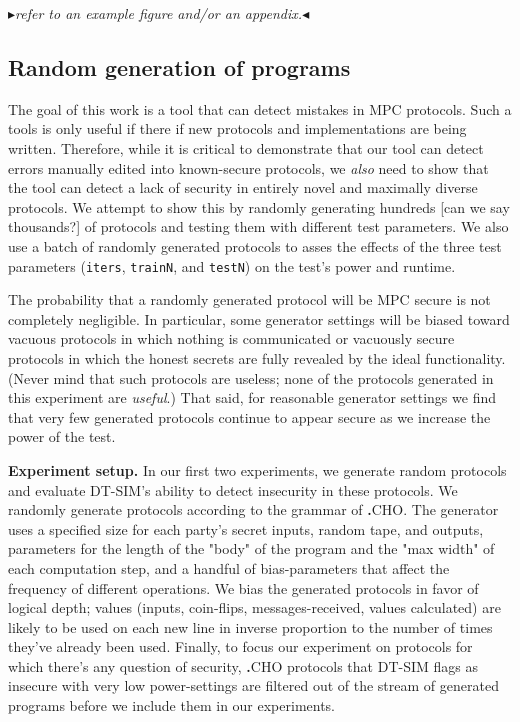 \documentclass[compsoc, conference, a4paper, 10pt, times]{IEEEtran}
\renewcommand{\paragraph}[1]{\vspace*{2pt}\noindent\textbf{#1}}
\newcommand{\langname}{\textsc{\textbf{.}CHO}\xspace}
\newcommand{\toolname}{\textsc{DT-SIM}\xspace}
\newcommand{\mynote}[2]
    {{\color{red} \fbox{\bfseries\sffamily\scriptsize#1}
    {\small$\blacktriangleright$\textsf{\emph{#2}}$\blacktriangleleft$}}~}
\newcommand{\todo}[1]{\mynote{TODO}{#1}}
\begin{document}
\todo{refer to an example figure and/or an appendix.}

\subsection{Random generation of programs}
\label{sec:random-protocols}

The goal of this work is a tool that can detect mistakes in MPC protocols.
Such a tools is only useful if there if new protocols and implementations are being written.
Therefore, while it is critical to demonstrate that our tool can detect errors manually edited into known-secure protocols,
we \textit{also} need to show that the tool can detect a lack of security in entirely novel and maximally diverse protocols.
We attempt to show this by randomly generating hundreds [can we say thousands?] of protocols and testing them with different test parameters.
We also use a batch of randomly generated protocols to asses the effects of the three test parameters
(\texttt{iters}, \texttt{trainN}, and \texttt{testN})
on the test's power and runtime.

The probability that a randomly generated protocol will be MPC secure is not completely negligible.
In particular, some generator settings will be biased toward vacuous protocols in which nothing is communicated
or vacuously secure protocols in which the honest secrets are fully revealed by the ideal functionality.
(Never mind that such protocols are useless; none of the protocols generated in this experiment are \textit{useful}.)
That said, for reasonable generator settings we find that very few generated protocols
continue to appear secure as we increase the power of the test.

\paragraph{Experiment setup.}
In our first two experiments, we generate random protocols and evaluate \toolname's ability to detect insecurity in these protocols.
We randomly generate protocols according to the grammar of \langname.
The generator uses a specified size for each party's secret inputs, random tape, and outputs,
parameters for the length of the "body" of the program and the "max width" of each computation step,
and a handful of bias-parameters that affect the frequency of different operations.
We bias the generated protocols in favor of logical depth;
values (inputs, coin-flips, messages-received, values calculated) are likely
to be used on each new line in inverse proportion to the number of times they've already been used.
Finally, to focus our experiment on protocols for which there's any question of security,
\langname protocols that \toolname flags as insecure with very low power-settings
are filtered out of the stream of generated programs before we include them in our experiments.
\end{document}
